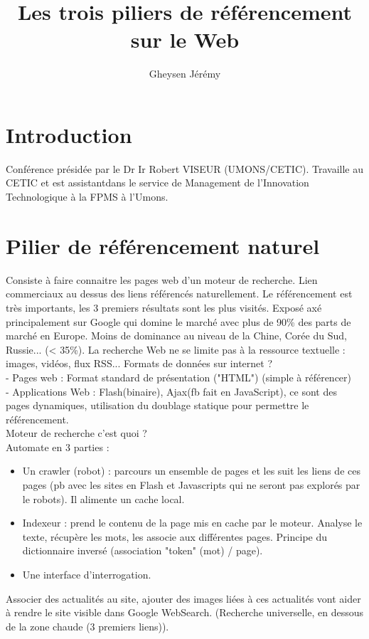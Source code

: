 \documentclass[10pt,a4paper]{article}
\author{Gheysen Jérémy}
\title{Les trois piliers de référencement sur le Web}
\begin{document}
\maketitle
\newpage
\section{Introduction}
Conférence présidée par le Dr Ir Robert VISEUR (UMONS/CETIC).
Travaille au CETIC et est assistantdans le service de Management de l'Innovation Technologique à la FPMS à l'Umons.
\section{Pilier de référencement naturel}
Consiste à faire connaitre les pages web d'un moteur de recherche. 
Lien commerciaux au dessus des liens référencés naturellement. 
Le référencement est très importants, les 3 premiers résultats sont les plus visités. 
Exposé axé principalement sur Google qui domine le marché avec plus de 90\% des parts de marché en Europe. 
Moins de dominance au niveau de la Chine, Corée du Sud, Russie... (< 35\%).
La recherche Web ne se limite pas à la ressource textuelle : images, vidéos, flux RSS...
Formats de données sur internet ? \\
- Pages web : Format standard de présentation ("HTML") (simple à référencer) \\
- Applications Web : Flash(binaire), Ajax(fb fait en JavaScript), ce sont des pages dynamiques, utilisation du doublage statique pour permettre le référencement. \\
Moteur de recherche c'est quoi ? \\
Automate en 3 parties : 
\begin{itemize}
\item Un crawler (robot) : parcours un ensemble de pages et les suit les liens de ces pages (pb avec les sites en Flash et Javascripts qui ne seront pas explorés par le robots). Il alimente un cache local. 
\item Indexeur : prend le contenu de la page mis en cache par le moteur. Analyse le texte, récupère les mots, les associe aux différentes pages. Principe du dictionnaire inversé (association "token" (mot) / page).
\item Une interface d'interrogation. 
\end{itemize}
Associer des actualités au site, ajouter des images liées à ces actualités vont aider à rendre le site visible dans Google WebSearch. (Recherche universelle, en dessous de la zone chaude (3 premiers liens)).
\end{document}
